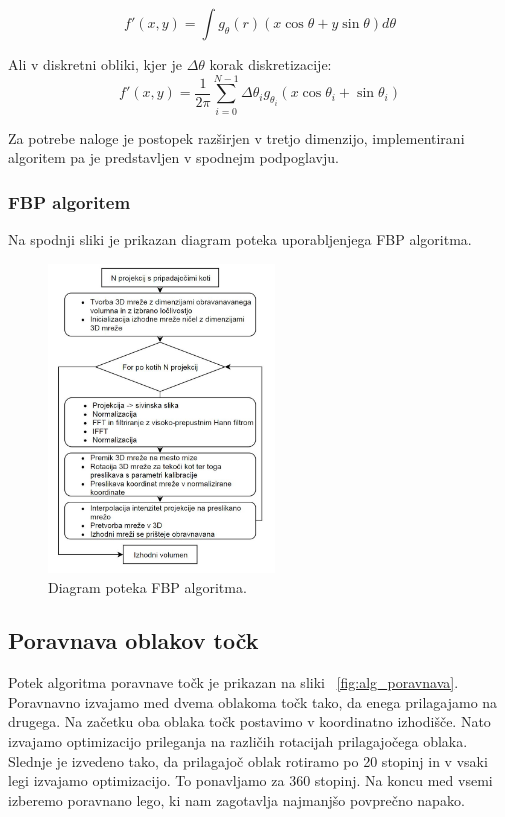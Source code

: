 \documentclass[journal,a4paper,twoside]{sty/IEEEtran}
\begin{document}
\begin{equation}
f'(x,y) = \int g_{\theta}(r) (x \cos\theta + y \sin \theta)d\theta
\end{equation}

Ali v diskretni obliki, kjer je $\Delta\theta$ korak diskretizacije:
\begin{equation}
f'(x,y) = \frac{1}{2\pi} \sum\limits_{i=0}^{N-1} \Delta\theta_i g_{\theta_i}(x \cos\theta_i + \sin\theta_i)
\end{equation}

Za potrebe naloge je postopek razširjen v tretjo dimenzijo, implementirani algoritem pa je predstavljen v spodnejm podpoglavju.

\subsubsection{FBP algoritem}

Na spodnji sliki je prikazan diagram poteka uporabljenjega FBP algoritma.

\begin{figure}[H]
	\centerline{\includegraphics[width=6cm]{fig/FBPflow}}
	\caption{Diagram poteka FBP algoritma.}
	\label{fig:fbp_flow}
\end{figure}

\subsection{Poravnava oblakov točk}
%
Potek algoritma poravnave točk je prikazan na sliki ~\ref{fig:alg_poravnava}. Poravnavno izvajamo med dvema oblakoma točk tako, da enega prilagajamo na drugega. Na začetku oba oblaka točk postavimo v koordinatno izhodišče. Nato izvajamo optimizacijo prileganja na različih rotacijah prilagajočega oblaka. Slednje je izvedeno tako, da prilagajoč oblak rotiramo po 20 stopinj in v vsaki legi izvajamo optimizacijo. To ponavljamo za 360 stopinj. Na koncu med vsemi izberemo poravnano lego, ki nam zagotavlja najmanjšo povprečno napako. 
\end{document}
